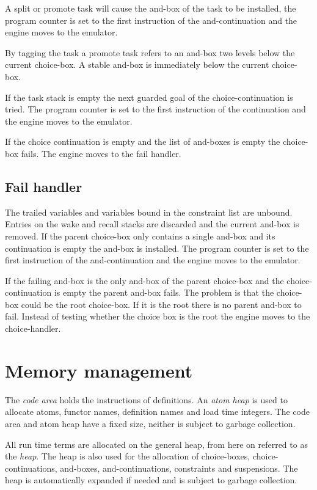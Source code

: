 A split or promote task will cause the and-box of the task to be
installed, the program counter is set to the first instruction of the
and-continuation and the engine moves to the emulator.

By tagging the task a promote task refers to an
and-box two levels below the current choice-box. A stable and-box is
immediately below the current choice-box.

If the task stack is empty the next guarded goal of the
choice-continuation is tried. The program counter is set to the first
instruction of the continuation and the engine moves to the emulator.

If the choice continuation is empty and the list of and-boxes is empty 
the choice-box fails. The engine moves to the fail handler.

\subsection*{Fail handler}

The trailed variables and variables bound in the constraint list are
unbound. Entries on the wake and recall stacks are discarded and the
current and-box is removed. If the parent choice-box only contains a
single and-box and its continuation is empty the and-box is installed.
The program counter is set to the first instruction of the
and-continuation and the engine moves to the emulator.

If the failing and-box is the only and-box of the parent
choice-box and the choice-continuation is empty the parent and-box
fails. The problem is that the choice-box could be the root
choice-box. If it is the root there is no parent and-box to fail. 
Instead of testing whether the choice box is the root the engine
moves to the choice-handler. 

\section{Memory management}

The {\em code area} holds the instructions of definitions. An {\em
atom heap} is used to allocate atoms, functor names, definition names
and load time integers. The code area and atom heap have a fixed size,
neither is subject to garbage collection.

All run time terms are allocated on the general heap, from 
here on referred to as the {\em heap}. The heap is also used 
for the allocation of choice-boxes, choice-continuations, 
and-boxes, and-continuations, constraints and suspensions.  
The heap is automatically expanded if needed and is 
subject to garbage collection.



